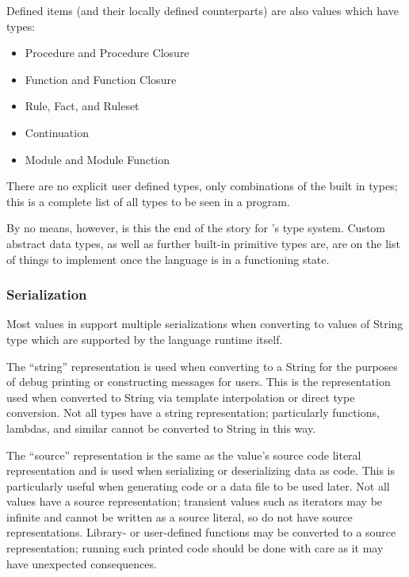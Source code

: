 \noindent
Defined items (and their locally defined counterparts) are also values which
have types:

\begin{itemize}
    \item Procedure and Procedure Closure
    \item Function and Function Closure
    \item Rule, Fact, and Ruleset
    \item Continuation
    \item Module and Module Function
\end{itemize}

\noindent
There are no explicit user defined types, only combinations of the built in
types; this is a complete list of all types to be seen in a \Trilogy{}
program.

By no means, however, is this the end of the story for \Trilogy{}'s type
system. Custom abstract data types, as well as further built-in primitive types
are, are on the list of things to implement once the language is in a functioning
state.

\subsubsection{Serialization}

Most values in \Trilogy{} support multiple serializations when converting
to values of String type which are supported by the language runtime itself.

The ``string'' representation is used when converting to a String for
the purposes of debug printing or constructing messages for users.
This is the representation used when converted to String via template
interpolation or direct type conversion. Not all types have a string
representation; particularly functions, lambdas, and similar cannot
be converted to String in this way.

The ``source'' representation is the same as the value's source code literal
representation and is used when serializing or deserializing data as code.
This is particularly useful when generating code or a data file to be used
later. Not all values have a source representation; transient values such
as iterators may be infinite and cannot be written as a source literal, so
do not have source representations. Library- or user-defined functions may
be converted to a source representation; running such printed code should
be done with care as it may have unexpected consequences.

